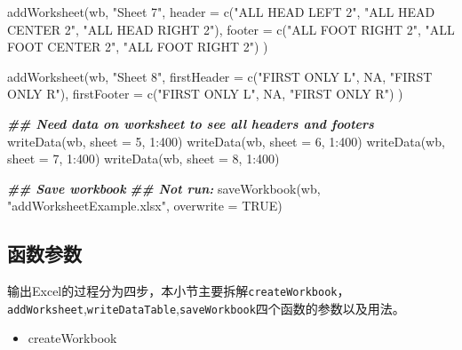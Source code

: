 \documentclass[
]{book}
\newenvironment{Shaded}{\begin{snugshade}}{\end{snugshade}}
\newcommand{\AttributeTok}[1]{\textcolor[rgb]{0.77,0.63,0.00}{#1}}
\newcommand{\ConstantTok}[1]{\textcolor[rgb]{0.00,0.00,0.00}{#1}}
\newcommand{\DecValTok}[1]{\textcolor[rgb]{0.00,0.00,0.81}{#1}}
\newcommand{\DocumentationTok}[1]{\textcolor[rgb]{0.56,0.35,0.01}{\textbf{\textit{#1}}}}
\newcommand{\FunctionTok}[1]{\textcolor[rgb]{0.00,0.00,0.00}{#1}}
\newcommand{\NormalTok}[1]{#1}
\newcommand{\SpecialCharTok}[1]{\textcolor[rgb]{0.00,0.00,0.00}{#1}}
\newcommand{\StringTok}[1]{\textcolor[rgb]{0.31,0.60,0.02}{#1}}
\providecommand{\tightlist}{%
  \setlength{\itemsep}{0pt}\setlength{\parskip}{0pt}}
\begin{document}
\begin{Shaded}
\begin{Highlighting}[]
\FunctionTok{addWorksheet}\NormalTok{(wb, }\StringTok{"Sheet 7"}\NormalTok{,}
  \AttributeTok{header =} \FunctionTok{c}\NormalTok{(}\StringTok{"ALL HEAD LEFT 2"}\NormalTok{, }\StringTok{"ALL HEAD CENTER 2"}\NormalTok{, }\StringTok{"ALL HEAD RIGHT 2"}\NormalTok{),}
  \AttributeTok{footer =} \FunctionTok{c}\NormalTok{(}\StringTok{"ALL FOOT RIGHT 2"}\NormalTok{, }\StringTok{"ALL FOOT CENTER 2"}\NormalTok{, }\StringTok{"ALL FOOT RIGHT 2"}\NormalTok{)}
\NormalTok{)}

\FunctionTok{addWorksheet}\NormalTok{(wb, }\StringTok{"Sheet 8"}\NormalTok{,}
  \AttributeTok{firstHeader =} \FunctionTok{c}\NormalTok{(}\StringTok{"FIRST ONLY L"}\NormalTok{, }\ConstantTok{NA}\NormalTok{, }\StringTok{"FIRST ONLY R"}\NormalTok{),}
  \AttributeTok{firstFooter =} \FunctionTok{c}\NormalTok{(}\StringTok{"FIRST ONLY L"}\NormalTok{, }\ConstantTok{NA}\NormalTok{, }\StringTok{"FIRST ONLY R"}\NormalTok{)}
\NormalTok{)}

\DocumentationTok{\#\# Need data on worksheet to see all headers and footers}
\FunctionTok{writeData}\NormalTok{(wb, }\AttributeTok{sheet =} \DecValTok{5}\NormalTok{, }\DecValTok{1}\SpecialCharTok{:}\DecValTok{400}\NormalTok{)}
\FunctionTok{writeData}\NormalTok{(wb, }\AttributeTok{sheet =} \DecValTok{6}\NormalTok{, }\DecValTok{1}\SpecialCharTok{:}\DecValTok{400}\NormalTok{)}
\FunctionTok{writeData}\NormalTok{(wb, }\AttributeTok{sheet =} \DecValTok{7}\NormalTok{, }\DecValTok{1}\SpecialCharTok{:}\DecValTok{400}\NormalTok{)}
\FunctionTok{writeData}\NormalTok{(wb, }\AttributeTok{sheet =} \DecValTok{8}\NormalTok{, }\DecValTok{1}\SpecialCharTok{:}\DecValTok{400}\NormalTok{)}

\DocumentationTok{\#\# Save workbook}
\DocumentationTok{\#\# Not run: }
\FunctionTok{saveWorkbook}\NormalTok{(wb, }\StringTok{"addWorksheetExample.xlsx"}\NormalTok{, }\AttributeTok{overwrite =} \ConstantTok{TRUE}\NormalTok{)}
\end{Highlighting}
\end{Shaded}

\hypertarget{ux51fdux6570ux53c2ux6570}{%
\subsection{函数参数}\label{ux51fdux6570ux53c2ux6570}}

输出Excel的过程分为四步，本小节主要拆解\texttt{createWorkbook}，\texttt{addWorksheet},\texttt{writeDataTable},\texttt{saveWorkbook}四个函数的参数以及用法。

\begin{itemize}
\tightlist
\item
  createWorkbook
\end{itemize}
\end{document}
